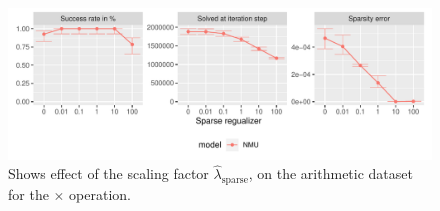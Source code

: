 \begin{figure}[h]
\centering
\includegraphics[width=\linewidth]{results/simple_function_static_regualization_mul.pdf}
\caption{Shows effect of the scaling factor $\hat{\lambda}_{\mathrm{sparse}}$, on the arithmetic dataset for the $\bm{\times}$ operation.}
\label{fig:simple-fnction-static-regularizer-mul}
\end{figure}
